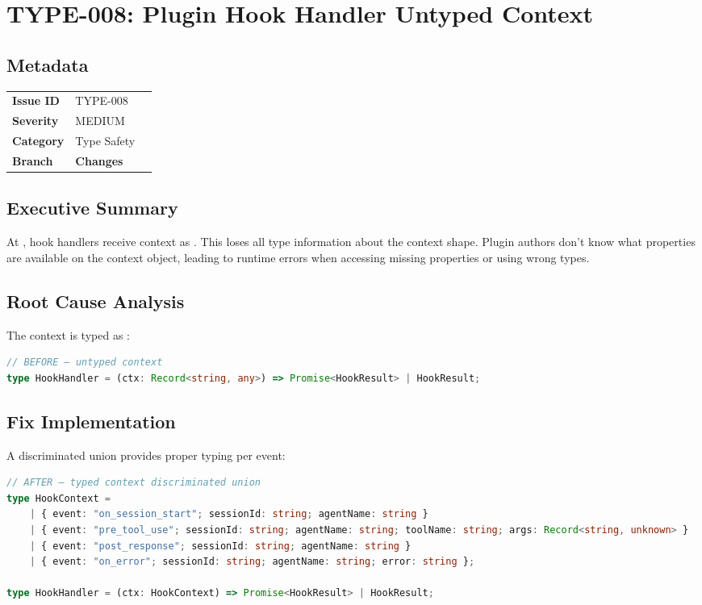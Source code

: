 \section{TYPE-008: Plugin Hook Handler Untyped Context}
\label{sec:type-008}
\subsection*{Metadata}
\begin{tabular}{ll}
\textbf{Issue ID} & TYPE-008 \\
\textbf{Severity} & MEDIUM \\
\textbf{Category} & Type Safety \\
\textbf{Branch} & 
\textbf{Changes} &  \\
\end{tabular}

\subsection*{Executive Summary}
At , hook handlers receive context as . This loses all type information about the context shape. Plugin authors don't know what properties are available on the context object, leading to runtime errors when accessing missing properties or using wrong types.

\subsection*{Root Cause Analysis}
The context is typed as :

\begin{lstlisting}[language=TypeScript]
// BEFORE — untyped context
type HookHandler = (ctx: Record<string, any>) => Promise<HookResult> | HookResult;
\end{lstlisting}

\subsection*{Fix Implementation}
A discriminated union provides proper typing per event:

\begin{lstlisting}[language=TypeScript]
// AFTER — typed context discriminated union
type HookContext =
    | { event: "on_session_start"; sessionId: string; agentName: string }
    | { event: "pre_tool_use"; sessionId: string; agentName: string; toolName: string; args: Record<string, unknown> }
    | { event: "post_response"; sessionId: string; agentName: string }
    | { event: "on_error"; sessionId: string; agentName: string; error: string };

type HookHandler = (ctx: HookContext) => Promise<HookResult> | HookResult;
\end{lstlisting}

